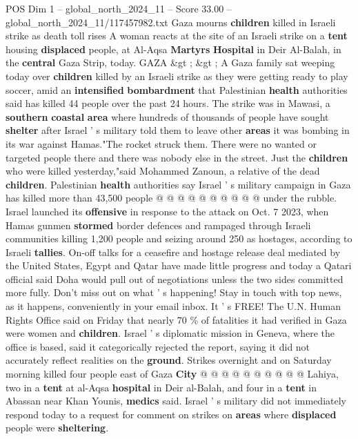 \begin{textsample}{POS Dim 1 – global\_north\_2024\_11 – Score 33.00 – global\_north\_2024\_11/117457982.txt}  \label{ex:f1_pos_339}
Gaza mourns \textbf{children} killed in Israeli strike as death toll rises A woman reacts at the site of an Israeli strike on a \textbf{tent} housing \textbf{displaced} people, at Al-Aqsa \textbf{Martyrs} \textbf{Hospital} in Deir Al-Balah, in the \textbf{central} Gaza Strip, today.
GAZA \&gt ; \&gt ; A Gaza family sat weeping today over \textbf{children} killed by an Israeli strike as they were getting ready to play soccer, amid an \textbf{intensified} \textbf{bombardment} that Palestinian \textbf{health} authorities said has killed 44 people over the past 24 hours.
The strike was in Mawasi, a \textbf{southern} \textbf{coastal} \textbf{area} where hundreds of thousands of people have sought \textbf{shelter} after Israel ' s military told them to leave other \textbf{areas} it was bombing in its war against Hamas."The rocket struck them.
There were no wanted or targeted people there and there was nobody else in the street.
Just the \textbf{children} who were killed yesterday,"said Mohammed Zanoun, a relative of the dead \textbf{children}.
Palestinian \textbf{health} authorities say Israel ' s military campaign in Gaza has killed more than 43,500 people @ @ @ @ @ @ @ @ @ @ under the rubble.
Israel launched its \textbf{offensive} in response to the attack on Oct. 7 2023, when Hamas gunmen \textbf{stormed} border defences and rampaged through Israeli communities killing 1,200 people and seizing around 250 as hostages, according to Israeli \textbf{tallies}.
On-off talks for a ceasefire and hostage release deal mediated by the United States, Egypt and Qatar have made little progress and today a Qatari official said Doha would pull out of negotiations unless the two sides committed more fully.
Don't miss out on what ' s happening!
Stay in touch with top news, as it happens, conveniently in your email inbox.
It ' s FREE!
The U.N.
Human Rights Office said on Friday that nearly 70 \% of fatalities it had verified in Gaza were women and \textbf{children}.
Israel ' s diplomatic mission in Geneva, where the office is based, said it categorically rejected the report, saying it did not accurately reflect realities on the \textbf{ground}.
Strikes overnight and on Saturday morning killed four people east of Gaza \textbf{City} @ @ @ @ @ @ @ @ @ @ Lahiya, two in a \textbf{tent} at al-Aqsa \textbf{hospital} in Deir al-Balah, and four in a \textbf{tent} in Abassan near Khan Younis, \textbf{medics} said.
Israel ' s military did not immediately respond today to a request for comment on strikes on \textbf{areas} where \textbf{displaced} people were \textbf{sheltering}.

\end{textsample}
